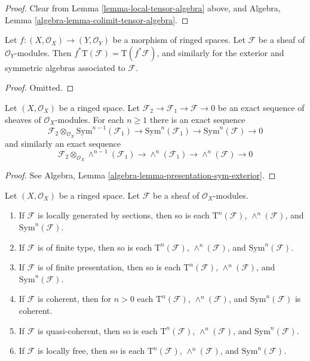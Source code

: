 \begin{proof}
Clear from Lemma \ref{lemma-local-tensor-algebra} above, and
Algebra, Lemma \ref{algebra-lemma-colimit-tensor-algebra}.
\end{proof}

\begin{lemma}
\label{lemma-pullback-tensor-algebra}
Let $f : (X, \mathcal{O}_X) \to (Y, \mathcal{O}_Y)$ be a morphism of
ringed spaces. Let $\mathcal{F}$ be a sheaf of $\mathcal{O}_Y$-modules.
Then $f^*\text{T}(\mathcal{F}) = \text{T}(f^*\mathcal{F})$,
and similarly for the exterior and symmetric algebras associated
to $\mathcal{F}$.
\end{lemma}

\begin{proof}
Omitted.
\end{proof}

\begin{lemma}
\label{lemma-presentation-sym-exterior}
Let $(X, \mathcal{O}_X)$ be a ringed space.
Let $\mathcal{F}_2 \to \mathcal{F}_1 \to \mathcal{F} \to 0$
be an exact sequence of sheaves of $\mathcal{O}_X$-modules.
For each $n \geq 1$ there is an exact sequence
$$
\mathcal{F}_2 \otimes_{\mathcal{O}_X} \text{Sym}^{n - 1}(\mathcal{F}_1)
\to
\text{Sym}^n(\mathcal{F}_1)
\to
\text{Sym}^n(\mathcal{F})
\to
0
$$
and similarly an exact sequence
$$
\mathcal{F}_2 \otimes_{\mathcal{O}_X} \wedge^{n - 1}(\mathcal{F}_1)
\to
\wedge^n(\mathcal{F}_1)
\to
\wedge^n(\mathcal{F})
\to
0
$$
\end{lemma}

\begin{proof}
See Algebra, Lemma \ref{algebra-lemma-presentation-sym-exterior}.
\end{proof}

\begin{lemma}
\label{lemma-tensor-algebra-permanence}
Let $(X, \mathcal{O}_X)$ be a ringed space.
Let $\mathcal{F}$ be a sheaf of $\mathcal{O}_X$-modules.
\begin{enumerate}
\item If $\mathcal{F}$ is locally generated by sections,
then so is each $\text{T}^n(\mathcal{F})$,
$\wedge^n(\mathcal{F})$, and $\text{Sym}^n(\mathcal{F})$.
\item If $\mathcal{F}$ is of finite type,
then so is each $\text{T}^n(\mathcal{F})$,
$\wedge^n(\mathcal{F})$, and $\text{Sym}^n(\mathcal{F})$.
\item If $\mathcal{F}$ is of finite presentation,
then so is each $\text{T}^n(\mathcal{F})$,
$\wedge^n(\mathcal{F})$, and $\text{Sym}^n(\mathcal{F})$.
\item If $\mathcal{F}$ is coherent,
then for $n > 0$ each $\text{T}^n(\mathcal{F})$,
$\wedge^n(\mathcal{F})$, and $\text{Sym}^n(\mathcal{F})$
is coherent.
\item If $\mathcal{F}$ is quasi-coherent,
then so is each $\text{T}^n(\mathcal{F})$,
$\wedge^n(\mathcal{F})$, and $\text{Sym}^n(\mathcal{F})$.
\item If $\mathcal{F}$ is locally free,
then so is each $\text{T}^n(\mathcal{F})$,
$\wedge^n(\mathcal{F})$, and $\text{Sym}^n(\mathcal{F})$.
\end{enumerate}
\end{lemma}

